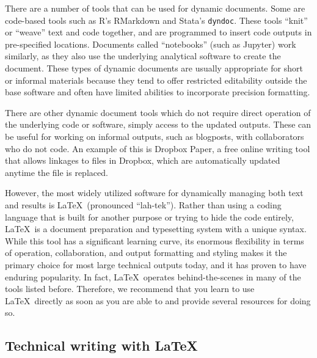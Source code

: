 There are a number of tools that can be used for dynamic documents.
Some are code-based tools such as R's RMarkdown
and Stata's \texttt{dyndoc}.
These tools ``knit'' or ``weave'' text and code together,
and are programmed to insert code outputs in pre-specified locations.
Documents called ``notebooks'' (such as Jupyter) work similarly,
as they also use the underlying analytical software to create the document.
These types of dynamic documents are usually appropriate for short or informal materials
because they tend to offer restricted editability outside the base software
and often have limited abilities to incorporate precision formatting.

There are other dynamic document tools
which do not require direct operation of the underlying code or software,
simply access to the updated outputs.
These can be useful for working on informal outputs, such as blogposts,
with collaborators who do not code.
An example of this is Dropbox Paper,
a free online writing tool that allows linkages to files in Dropbox,
which are automatically updated anytime the file is replaced.

However, the most widely utilized software
for dynamically managing both text and results is \LaTeX\ (pronounced ``lah-tek'').
  \index{\LaTeX}
Rather than using a coding language that is built for another purpose
or trying to hide the code entirely,
\LaTeX\ is a document preparation and typesetting system with a unique syntax.
While this tool has a significant learning curve,
its enormous flexibility in terms of operation, collaboration,
and output formatting and styling
makes it the primary choice for most large technical outputs today,
and it has proven to have enduring popularity.
In fact, \LaTeX\ operates behind-the-scenes in many of the tools listed before.
Therefore, we recommend that you learn to use \LaTeX\ directly
as soon as you are able to and provide several resources for doing so.

\subsection{Technical writing with \LaTeX}

